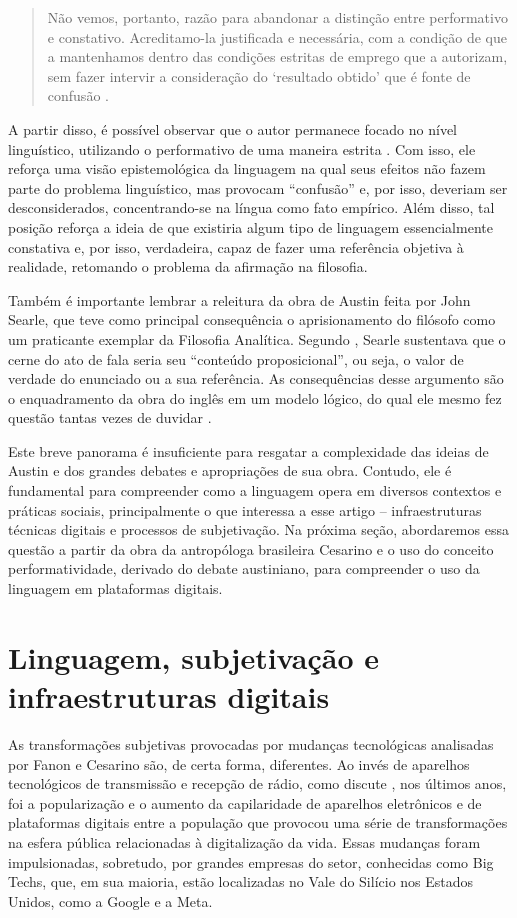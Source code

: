 \documentclass[portuguese]{textolivre}
\begin{document}
\begin{quote}
    Não vemos, portanto, razão para abandonar a distinção entre performativo e constativo. Acreditamo-la justificada e necessária, com a condição de que a mantenhamos dentro das condições estritas de emprego que a autorizam, sem fazer intervir a consideração do ‘resultado obtido’ que é fonte de confusão \cite[p. 305]{benveniste1991filosofia}.
\end{quote}

A partir disso, é possível observar que o autor permanece focado no nível linguístico, utilizando o performativo de uma maneira estrita \cite{ottoni2002austin}. Com isso, ele reforça uma visão epistemológica da linguagem na qual seus efeitos não fazem parte do problema linguístico, mas provocam “confusão” e, por isso, deveriam ser desconsiderados, concentrando-se na língua como fato empírico. Além disso, tal posição reforça a ideia de que existiria algum tipo de linguagem essencialmente constativa e, por isso, verdadeira, capaz de fazer uma referência objetiva à realidade, retomando o problema da afirmação na filosofia.

Também é importante lembrar a releitura da obra de Austin feita por John Searle, que teve como principal consequência o aprisionamento do filósofo como um praticante exemplar da Filosofia Analítica. Segundo \textcite{rajagopalan1996austin}, Searle sustentava que o cerne do ato de fala seria seu “conteúdo proposicional”, ou seja, o valor de verdade do enunciado ou a sua referência. As consequências desse argumento são o enquadramento da obra do inglês em um modelo lógico, do qual ele mesmo fez questão tantas vezes de duvidar \cite{austin1962how}.

Este breve panorama é insuficiente para resgatar a complexidade das ideias de Austin e dos grandes debates e apropriações de sua obra. Contudo, ele é fundamental para compreender como a linguagem opera em diversos contextos e práticas sociais, principalmente o que interessa a esse artigo – infraestruturas técnicas digitais e processos de subjetivação. Na próxima seção, abordaremos essa questão a partir da obra da antropóloga brasileira Cesarino e o uso do conceito performatividade, derivado do debate austiniano, para compreender o uso da linguagem em plataformas digitais.


\section{Linguagem, subjetivação e infraestruturas digitais}\label{sec-conduta}
As transformações subjetivas provocadas por mudanças tecnológicas analisadas por Fanon e Cesarino são, de certa forma, diferentes. Ao invés de aparelhos tecnológicos de transmissão e recepção de rádio, como discute \textcite{fanon2021argelia}, nos últimos anos, foi a popularização e o aumento da capilaridade de aparelhos eletrônicos e de plataformas digitais entre a população que provocou uma série de transformações na esfera pública relacionadas à digitalização da vida. Essas mudanças foram impulsionadas, sobretudo, por grandes empresas do setor, conhecidas como Big Techs, que, em sua maioria, estão localizadas no  Vale do Silício nos Estados Unidos, como a Google e a Meta.
\end{document}
